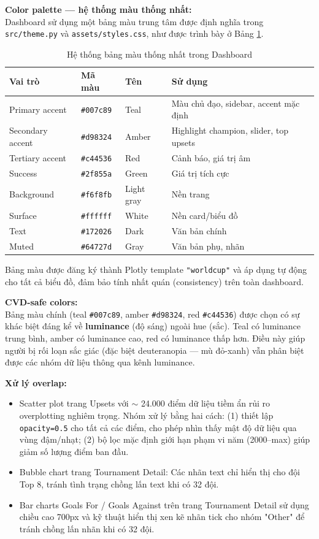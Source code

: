 \documentclass[12pt,a4paper]{article}
\begin{document}
\textbf{Color palette --- hệ thống màu thống nhất:} \\
Dashboard sử dụng một bảng màu trung tâm được định nghĩa trong \texttt{src/theme.py} và \texttt{assets/styles.css}, như được trình bày ở Bảng \ref{tab:color_palette}.

\begin{table}[H]
\centering
\caption{Hệ thống bảng màu thống nhất trong Dashboard}
\label{tab:color_palette}
\begin{tabular}{lllp{7.5cm}}
\toprule
\textbf{Vai trò} & \textbf{Mã màu} & \textbf{Tên} & \textbf{Sử dụng} \\
\midrule
Primary accent & \texttt{\#007c89} & Teal & Màu chủ đạo, sidebar, accent mặc định \\
Secondary accent & \texttt{\#d98324} & Amber & Highlight champion, slider, top upsets \\
Tertiary accent & \texttt{\#c44536} & Red & Cảnh báo, giá trị âm \\
Success & \texttt{\#2f855a} & Green & Giá trị tích cực \\
Background & \texttt{\#f6f8fb} & Light gray & Nền trang \\
Surface & \texttt{\#ffffff} & White & Nền card/biểu đồ \\
Text & \texttt{\#172026} & Dark & Văn bản chính \\
Muted & \texttt{\#64727d} & Gray & Văn bản phụ, nhãn \\
\bottomrule
\end{tabular}
\end{table}

Bảng màu được đăng ký thành Plotly template \texttt{"worldcup"} và áp dụng tự động cho tất cả biểu đồ, đảm bảo tính nhất quán (consistency) trên toàn dashboard.

\textbf{CVD-safe colors:} \\
Bảng màu chính (teal \texttt{\#007c89}, amber \texttt{\#d98324}, red \texttt{\#c44536}) được chọn có sự khác biệt đáng kể về \textbf{luminance} (độ sáng) ngoài hue (sắc). Teal có luminance trung bình, amber có luminance cao, red có luminance thấp hơn. Điều này giúp người bị rối loạn sắc giác (đặc biệt deuteranopia --- mù đỏ-xanh) vẫn phân biệt được các nhóm dữ liệu thông qua kênh luminance.

\textbf{Xử lý overlap:}
\begin{itemize}
    \item Scatter plot trang Upsets với $\sim$ 24.000 điểm dữ liệu tiềm ẩn rủi ro overplotting nghiêm trọng. Nhóm xử lý bằng hai cách: (1) thiết lập \texttt{opacity=0.5} cho tất cả các điểm, cho phép nhìn thấy mật độ dữ liệu qua vùng đậm/nhạt; (2) bộ lọc mặc định giới hạn phạm vi năm (2000--max) giúp giảm số lượng điểm ban đầu.
    \item Bubble chart trang Tournament Detail: Các nhãn text chỉ hiển thị cho đội Top 8, tránh tình trạng chồng lấn text khi có 32 đội.
    \item Bar charts Goals For / Goals Against trên trang Tournament Detail sử dụng chiều cao 700px và kỹ thuật hiển thị xen kẽ nhãn tick cho nhóm "Other" để tránh chồng lấn nhãn khi có 32 đội.
\end{itemize}
\end{document}
